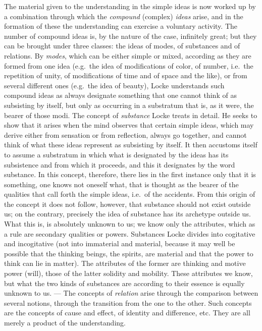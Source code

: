 The material given to the understanding in the simple ideas is now
worked up by a combination through which the \emph{compound} (complex)
\emph{ideas} arise, and in the formation of these the understanding can
exercise a voluntary activity. The number of compound ideas is, by the
nature of the case, infinitely great; but they can be brought under
three classes: the ideas of modes, of substances and of relations. By
\emph{modes}, which can be either simple or mixed, according as they
are formed from one idea (e.g.\ the idea of modifications of color, of
number, i.e.\ the repetition of unity, of modifications of time and of
space and the like), or from several different ones (e.g.\ the idea of
beauty), Locke understands such compound ideas as always designate
something that one cannot think of as subsisting by itself, but only as
occurring in a substratum that is, as it were, the bearer of those
modi. The concept of \emph{substance} Locke treats in detail. He seeks
to show that it arises when the mind observes that certain simple
ideas, which may derive either from sensation or from reflection,
always go together, and cannot think of what these ideas represent as
subsisting by itself. It then accustoms itself to assume a substratum
in which what is designated by the ideas has its subsistence and from
which it proceeds, and this it designates by the word substance. In
this concept, therefore, there lies in the first instance only that it
is something, one knows not oneself what, that is thought as the bearer
of the qualities that call forth the simple ideas, i.e.\ of the
accidents. From this origin of the concept it does not follow, however,
that substance should not exist outside us; on the contrary,
precisely the idea of substance has its archetype outside us. What this
is, is absolutely unknown to us; we know only the attributes, which as
a rule are secondary qualities or powers. Substances Locke divides into
cogitative and incogitative (not into immaterial and material, because
it may well be possible that the thinking beings, the spirits, are
material and that the power to think can lie in matter). The attributes
of the former are thinking and motive power (will), those of the latter
solidity and mobility. These attributes we know, but what the two kinds
of substances are according to their essence is equally unknown to us.
--- The concepts of \emph{relation} arise through the comparison
between several notions, through the transition from the one to the
other. Such concepts are the concepts of cause and effect, of identity
and difference, etc. They are all merely a product of the
understanding.


